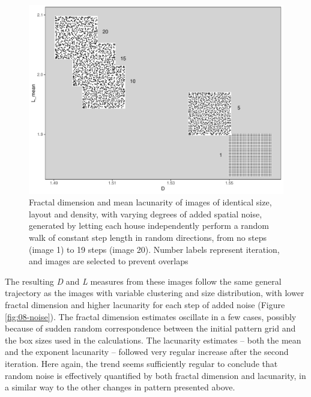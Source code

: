 \documentclass[
  12pt,
  a4paper, twoside]{book}
\begin{document}
\begin{figure}

{\centering \includegraphics[width=0.9\linewidth]{Results/fig08_noise_im} 

}

\caption[Effect of random noise on D and L]{Fractal dimension and mean lacunarity of images of identical size, layout and density, with varying degrees of added spatial noise, generated by letting each house independently perform a random walk of constant step length in random directions, from no steps (image 1) to 19 steps (image 20). Number labels represent iteration, and images are selected to prevent overlaps}\label{fig:08-noise-im}
\end{figure}

The resulting \emph{D} and \emph{L} measures from these images follow the same general trajectory as the images with variable clustering and size distribution, with lower fractal dimension and higher lacunarity for each step of added noise (Figure \ref{fig:08-noise}). The fractal dimension estimates oscillate in a few cases, possibly because of sudden random correspondence between the initial pattern grid and the box sizes used in the calculations. The lacunarity estimates -- both the mean and the exponent lacunarity -- followed very regular increase after the second iteration. Here again, the trend seems sufficiently regular to conclude that random noise is effectively quantified by both fractal dimension and lacunarity, in a similar way to the other changes in pattern presented above.
\end{document}
